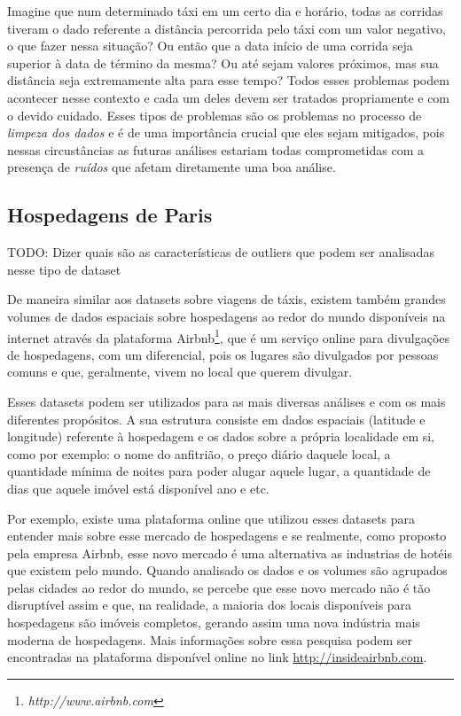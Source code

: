 Imagine que num determinado táxi em um certo dia e horário, todas as corridas tiveram o dado referente a distância percorrida pelo táxi com um valor negativo, o que fazer nessa situação? Ou então que a data início de uma corrida seja superior à data de término da mesma? Ou até sejam valores próximos, mas sua distância seja extremamente alta para esse tempo? Todos esses problemas podem acontecer nesse contexto e cada um deles devem ser tratados propriamente e com o devido cuidado. Esses tipos de problemas são os problemas no processo de \textit{limpeza dos dados} e é de uma importância crucial que eles sejam mitigados, pois nessas circustâncias as futuras análises estariam todas comprometidas com a presença de \textit{ruídos} que afetam diretamente uma boa análise.

\subsection{Hospedagens de Paris}

TODO: Dizer quais são as características de outliers que podem ser analisadas nesse tipo de dataset

De maneira similar aos datasets sobre viagens de táxis, existem também grandes volumes de dados espaciais sobre hospedagens ao redor do mundo disponíveis na internet através da plataforma Airbnb\footnote{\it http://www.airbnb.com}, que é um serviço online para divulgações de hospedagens, com um diferencial, pois os lugares são divulgados por pessoas comuns e que, geralmente, vivem no local que querem divulgar.

Esses datasets podem ser utilizados para as mais diversas análises e com os mais diferentes propósitos. A sua estrutura consiste em dados espaciais (latitude e longitude) referente à hospedagem e os dados sobre a própria localidade em si, como por exemplo: o nome do anfitrião, o preço diário daquele local, a quantidade mínima de noites para poder alugar aquele lugar, a quantidade de dias que aquele imóvel está disponível ano e etc.

Por exemplo, existe uma plataforma online que utilizou esses datasets para entender mais sobre esse mercado de hospedagens e se realmente, como proposto pela empresa Airbnb, esse novo mercado é uma alternativa as industrias de hotéis que existem pelo mundo. Quando analisado os dados e os volumes são agrupados pelas cidades ao redor do mundo, se percebe que esse novo mercado não é tão disruptível assim e que, na realidade, a maioria dos locais disponíveis para hospedagens são imóveis completos, gerando assim uma nova indústria mais moderna de hospedagens. Mais informações sobre essa pesquisa podem ser encontradas na plataforma disponível online no link \url{http://insideairbnb.com}.

